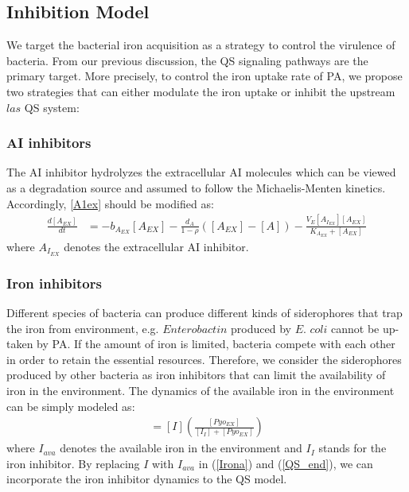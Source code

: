 \documentclass[runningheads]{llncs}
\begin{document}
\subsection{Inhibition Model}
We target the bacterial iron acquisition as a strategy to control the virulence of bacteria. From our previous discussion, the QS signaling pathways are the primary target. More precisely, to control the iron uptake rate of PA, we propose two strategies that can either modulate the iron uptake or inhibit the upstream $las$ QS system: 

\subsubsection{AI inhibitors}
The AI inhibitor hydrolyzes the extracellular AI molecules which can be viewed as a degradation source and assumed to follow the Michaelis-Menten kinetics. Accordingly, \eqref{A1ex} should be modified as:
\begingroup\makeatletter\def\f@size{9}\check@mathfonts
\def\maketag@@@#1{\hbox{\m@th\small\normalfont#1}}%
\begin{align}
\label{A1ex1} 
\frac{d[A_{EX}]}{dt} &= - b_{A_{EX}} [A_{EX}]  - \frac{d_{A}}{1-\rho} ([A_{EX}]  - [A])  -  \frac{V_{E} [A_{I_{EX}}] [A_{EX}] }{K_{A_{EX}} + [A_{EX}] } 
\end{align}\endgroup
where $A_{I_{EX}}$ denotes the extracellular AI inhibitor. 

\vspace{-10pt}

\subsubsection{Iron inhibitors}
Different species of bacteria can produce different kinds of siderophores that trap the iron from environment, e.g. $Enterobactin$ produced by $\textit{E. coli}$ cannot be up-taken by PA. If the amount of iron is limited, bacteria compete with each other in order to retain the essential resources. Therefore, we consider the siderophores produced by other bacteria as iron inhibitors that can limit the availability of iron in the environment.  The dynamics of the available iron in the environment can be simply modeled as: 
\begingroup\makeatletter\def\f@size{9}\check@mathfonts
\def\maketag@@@#1{\hbox{\m@th\small\normalfont#1}}%
\begin{align}
[I_{ava}] = [I](\frac{[Pyo_{EX}]}{[I_I] + [Pyo_{EX}]}) 
\end{align}\endgroup
where $I_{ava}$ denotes the available iron in the environment and $I_I$ stands for the iron inhibitor.  By replacing $I$ with $I_{ava}$ in (\ref{Irona}) and (\ref{QS_end}), we can incorporate the iron inhibitor dynamics to the QS model.     
\end{document}
